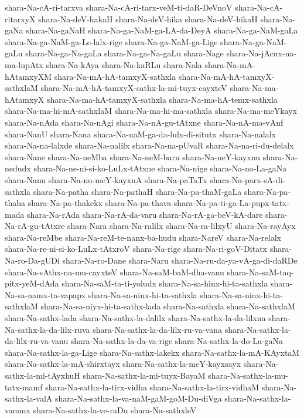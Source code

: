 {shara-Na-cA-ri-tarxva
shara-Na-cA-ri-tarx-veM-ti-daR-DeVnoV
shara-Na-cA-ritarxyX
shara-Na-deV-hakaH
shara-Na-deV-hika
shara-Na-deV-hikaH
shara-Na-gaNa
shara-Na-gaNaH
shara-Na-ga-NaM-ga-LA-da-DeyA
shara-Na-ga-NaM-gaLa
shara-Na-ga-NaM-ga-Le-lalx-rige
shara-Na-ga-NaM-ga-Lige
shara-Na-ga-NaM-gaLu
shara-Na-ga-Na-gaLa
shara-Na-ga-Na-gaLu
shara-Nage
shara-Na-jAcnx-na-ma-lupAtx
shara-Na-kAya
shara-Na-kaRLu
shara-Nala
shara-Na-mA-hAtamxyXM
shara-Na-mA-hA-tamxyX-sathxla
shara-Na-mA-hA-tamxyX-sathxlaM
shara-Na-mA-hA-tamxyX-sathx-la-mi-tuyx-cayxteV
shara-Na-ma-hAtamxyX
shara-Na-ma-hA-tamxyX-sathxla
shara-Na-ma-hA-temx-sathxla
shara-Na-ma-hi-mA-sathxlaM
shara-Na-ma-hi-ma-sathxla
shara-Na-ma-meYkayx
shara-Na-nAda
shara-Na-nAgi
shara-Na-nA-gu-tAtxne
shara-Na-nA-ma-vAnf
shara-NanU
shara-Nana
shara-Na-naM-ga-da-lulx-di-situtx
shara-Na-nalalx
shara-Na-na-lalxde
shara-Na-nalilx
shara-Na-na-pUvaR
shara-Na-na-ri-du-delalx
shara-Nane
shara-Na-neMba
shara-Na-neM-baru
shara-Na-neY-kayxnu
shara-Na-nedudx
shara-Na-ne-ni-si-ko-LuLx-tAtxne
shara-Na-nige
shara-Na-no-La-gaNa
shara-Nanu
shara-Na-nu-meY-kayxnA
shara-Na-paTaTx
shara-Na-parx-sA-di-sathxla
shara-Na-patha
shara-Na-pathaH
shara-Na-pa-thaM-gaLa
shara-Na-pa-thaha
shara-Na-pa-thakekx
shara-Na-pa-thava
shara-Na-pa-ti-ga-La-pupx-tatx-mada
shara-Na-rAda
shara-Na-rA-da-varu
shara-Na-rA-ga-beV-kA-dare
shara-Na-rA-gu-tAtxre
shara-Nara
shara-Na-ralilx
shara-Na-ra-lilxyU
shara-Na-rayAyx
shara-Na-reMbe
shara-Na-reM-te-nanx-ba-hudu
shara-NareV
shara-Na-relalx
shara-Na-re-ni-si-ko-LuLx-tAtxroV
shara-Na-rige
shara-Na-ri-goV-Ditatx
shara-Na-ro-Da-gUDi
shara-Na-ro-Dane
shara-Naru
shara-Na-ru-da-ya-vA-ga-di-daRDe
shara-Na-sAthx-na-mu-cayxteV
shara-Na-saM-baM-dha-vanu
shara-Na-saM-taq-pitx-yeM-dAda
shara-Na-saM-ta-ti-yoludx
shara-Na-sa-hinx-hi-ta-sathxla
shara-Na-sa-namx-ta-vapapx
shara-Na-sa-ninx-hi-ta-sathxla
shara-Na-sa-ninx-hi-ta-sathxlaM
shara-Na-sa-niyx-hi-ta-sathx-lada
shara-Na-sathxla
shara-Na-sathxlaM
shara-Na-sathx-lada
shara-Na-sathx-la-dalilx
shara-Na-sathx-la-da-lilxna
shara-Na-sathx-la-da-lilx-ruva
shara-Na-sathx-la-da-lilx-ru-va-vana
shara-Na-sathx-la-da-lilx-ru-va-vanu
shara-Na-sathx-la-da-va-rige
shara-Na-sathx-la-do-La-gaNa
shara-Na-sathx-la-ga-Lige
shara-Na-sathx-lakekx
shara-Na-sathx-la-mA-KAyxtaM
shara-Na-sathx-la-mA-shirxtayx
shara-Na-sathx-la-meY-kayxsayx
shara-Na-sathx-la-mi-tAyxhuH
shara-Na-sathx-la-mi-tuyx-BayaM
shara-Na-sathx-la-mu-tatx-mamf
shara-Na-sathx-la-tirx-vidha
shara-Na-sathx-la-tirx-vidhaM
shara-Na-sathx-la-valA
shara-Na-sathx-la-va-naM-gaM-goM-Du-diVga
shara-Na-sathx-la-vanunx
shara-Na-sathx-la-ve-raDu
shara-Na-sathxleV
}
